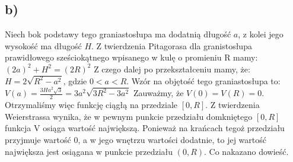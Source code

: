 \documentclass{article}
\begin{document}
\subsection{b)}
Niech bok podstawy tego graniastosłupa ma dodatnią długość $a$, z kolei jego wysokość ma długość $H$. \newline
Z twierdzenia Pitagorasa dla granistosłupa prawidłowego sześciokątnego wpisanego w kulę o promieniu R mamy:
$(2a)^{2} + H^{2} = (2R)^{2}$ Z czego dalej po przekształceniu mamy, że: $H = 2\sqrt{R^{2}-a^{2}}$, gdzie $0<a<R$. \newline
Wzór na objętość tego graniastosłupa to: $V(a) = \frac{3Ha^{2}\sqrt{3}}{2} = 3a^{2}\sqrt{3R^{2}-3a^{2}}$ \newline
Zauważmy, że $V(0) = V(R) = 0$. Otrzymaliśmy więc funkcję ciągłą na przedziale $[0, R]$. \newline \newline Z twierdzenia Weierstrassa wynika, że w pewnym punkcie przedziału domkniętego $[0, R]$ funkcja V osiąga wartość największą. Ponieważ na krańcach tegoż przedziału przyjmuje wartość 0, a w jego wnętrzu wartości dodatnie, to jej wartość największa jest osiągana w punkcie przedziału $(0, R)$. \newline
Co nakazano dowieść.
\end{document}
